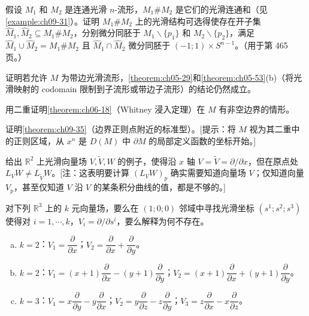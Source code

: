 \documentclass[../../main.tex]{subfiles}
\begin{document}
\begin{exercise}\label{exercise:ch09-12}
假设 $M_1$ 和 $M_2$ 是连通光滑 $n$-流形，$M_1\# M_2$ 是它们的光滑连通和（见\cref{example:ch09-31}）。证明 $M_1\# M_2$ 上的光滑结构可选得使存在开子集 $\widehat{M}_1,\widehat{M}_2\subseteq M_1\# M_2$，分别微分同胚于 $M_1\smallsetminus\{p_1\}$ 和 $M_2\smallsetminus\{p_2\}$，满足 $\widehat{M}_1\cup\widehat{M}_2=M_1\# M_2$ 且 $\widehat{M}_1\cap\widehat{M}_2$ 微分同胚于 $(-1;1)\times S^{n-1}$。（用于第 465 页。）
\end{exercise}

\begin{exercise}\label{exercise:ch09-13}
证明若允许 $M$ 为带边光滑流形，\cref{theorem:ch05-29}和\cref{theorem:ch05-53}(b)（将光滑映射的 codomain 限制到子流形或带边子流形）的结论仍然成立。
\end{exercise}

\begin{exercise}\label{exercise:ch09-14}
用二重证明\cref{theorem:ch06-18}（Whitney 浸入定理）在 $M$ 有非空边界的情形。
\end{exercise}

\begin{exercise}\label{exercise:ch09-15}
证明\cref{theorem:ch09-35}（边界正则点附近的标准型）。[提示：将 $M$ 视为其二重中的正则区域，从 $x^n$ 是 $D(M)$ 中 $\partial M$ 的局部定义函数的坐标开始。]
\end{exercise}

\begin{exercise}\label{exercise:ch09-16}
给出 $\mathbb{R}^2$ 上光滑向量场 $V,\widetilde{V},W$ 的例子，使得沿 $x$ 轴 $V=\widetilde{V}=\partial/\partial x$，但在原点处 $L_VW\neq L_{\widetilde{V}}W$。[注：这表明要计算 $(L_VW)_p$ 确实需要知道向量场 $V$；仅知道向量 $V_p$，甚至仅知道 $V$ 沿 $V$ 的某条积分曲线的值，都是不够的。]
\end{exercise}

\begin{exercise}\label{exercise:ch09-17}
对下列 $\mathbb{R}^3$ 上的 $k$ 元向量场，要么在 $(1;0;0)$ 邻域中寻找光滑坐标 $(s^1;s^2;s^3)$ 使得对 $i=1,\cdots ,k$，$V_i=\partial/\partial s^i$，要么解释为何不存在。
\begin{enumerate}[(a)]
\item $k=2$：$V_1=\dfrac{\partial}{\partial x}$；$V_2=\dfrac{\partial}{\partial x}+\dfrac{\partial}{\partial y}$。
\item $k=2$：$V_1=(x+1)\dfrac{\partial}{\partial x}-(y+1)\dfrac{\partial}{\partial y}$；$V_2=(x+1)\dfrac{\partial}{\partial x}+(y+1)\dfrac{\partial}{\partial y}$。
\item $k=3$：$V_1=x\dfrac{\partial}{\partial y}-y\dfrac{\partial}{\partial x}$；$V_2=y\dfrac{\partial}{\partial z}-z\dfrac{\partial}{\partial y}$；$V_3=z\dfrac{\partial}{\partial x}-x\dfrac{\partial}{\partial z}$。
\end{enumerate}
\end{exercise}
\end{document}
